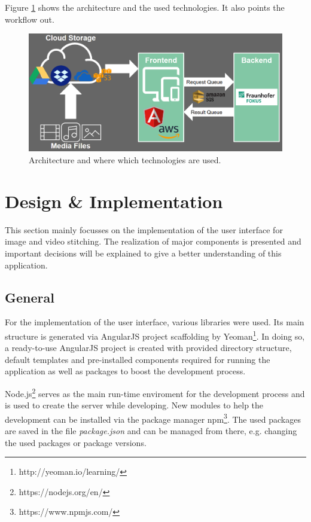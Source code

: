 \documentclass[conference]{IEEEtran}
\begin{document}
Figure \ref{fig:architecture} shows the architecture and the used technologies.
It also points the workflow out.

\begin{figure}[H]
	\centering
	\includegraphics[scale=0.27]{architecture.png}
	\caption{Architecture and where which technologies are used.}
	\label{fig:architecture}
\end{figure}

\section{Design \& Implementation}
This section mainly focusses on the implementation of the user interface for image and video stitching.
The realization of major components is presented and important decisions will be explained to give a better understanding of this application.

\subsection{General}
For the implementation of the user interface, various libraries were used.
Its main structure is generated via AngularJS project scaffolding by Yeoman\footnote{http://yeoman.io/learning/}.
In doing so, a ready-to-use AngularJS project is created with provided directory structure, default templates and pre-installed components required for running the application as well as packages to boost the development process.

Node.js\footnote{https://nodejs.org/en/} serves as the main run-time enviroment for the development process and is used to create the server while developing.
New modules to help the development can be installed via the package manager npm\footnote{https://www.npmjs.com/}.
The used packages are saved in the file \textit{package.json} and can be managed from there, e.g. changing the used packages or package versions.
\end{document}
